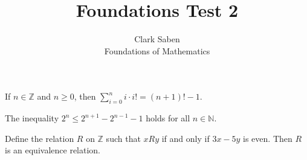 \documentclass[12pt]{article}
\newenvironment{theorem}[2][Theorem]{\begin{trivlist}
\item[\hskip \labelsep {\bfseries #1}\hskip \labelsep {\bfseries #2.}]}{\end{trivlist}}
\begin{document}
 
 
\title{Foundations Test 2}%
\author{Clark Saben\\ %
Foundations of Mathematics} %
 
\maketitle

\section{}
\begin{theorem}1
	If $n \in \mathbb{Z}$ and $n \geq 0$, then $\sum_{i=0}^{n}i\cdot i! = \left(n+1 \right)!-1$.
\end{theorem}
\begin{theorem}2
	The inequality $2^n \leq 2^{n+1}-2^{n-1}-1$ holds for all $n \in \mathbb{N}$.
\end{theorem}
\begin{theorem}3
	Define the relation $R$ on $\mathbb{Z}$ such that $xRy$ if and only if $3x-5y$ is even. Then $R$ is an equivalence relation.
\end{theorem}
\end{document}
